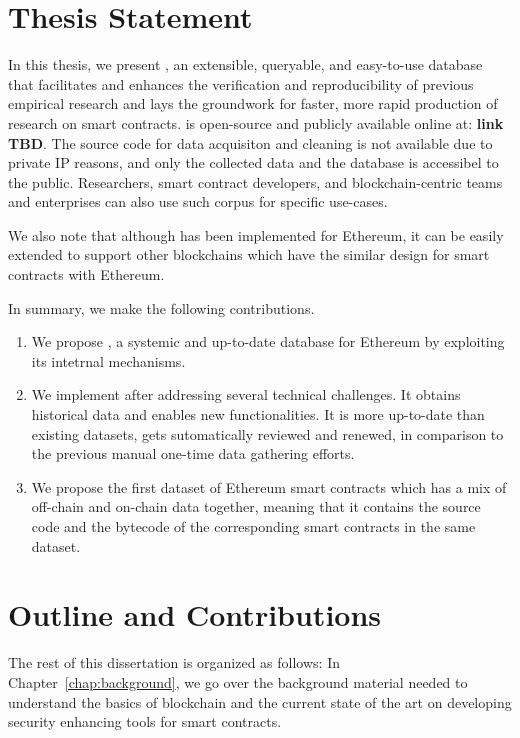 \section{Thesis Statement}
  In this thesis, we present \etherbase, an extensible, queryable, and easy-to-use database that facilitates and enhances the verification and reproducibility of previous empirical research and lays the groundwork for faster, more rapid production of research on smart contracts.
  \etherbase is open-source and publicly available online at: \textbf{link TBD}.
  The source code for data acquisiton and cleaning is not available due to private IP reasons, and only the collected data and the database is accessibel to the public.
  Researchers, smart contract developers, and blockchain-centric teams and enterprises can also use such corpus for specific use-cases.

  We also note that although \etherbase has been implemented for Ethereum, it can be easily extended to support other blockchains which have the similar design for smart contracts with Ethereum.

  In summary, we make the following contributions.
  \begin{enumerate}
    \item We propose \etherbase, a systemic and up-to-date database for Ethereum by exploiting its intetrnal mechanisms.
    \item We implement \etherbase after addressing several technical challenges. It obtains historical data and enables new functionalities. It is more up-to-date than existing datasets, gets sutomatically reviewed and renewed, in comparison to the previous manual one-time data gathering efforts.
    \item We propose the first dataset of Ethereum smart contracts which has a mix of off-chain and on-chain data together, meaning that it contains the source code and the bytecode of the corresponding smart contracts in the same dataset.
  \end{enumerate}


\section{Outline and Contributions}

  The rest of this dissertation is organized as follows:
  In Chapter~\ref{chap:background}, we go over the background material needed to understand the basics of blockchain and the current state of the art on developing security enhancing tools for smart contracts.

